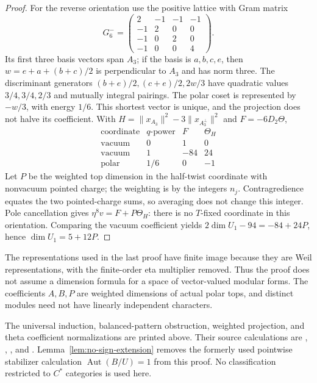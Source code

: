 \begin{proof}
For the reverse orientation use the positive lattice with Gram matrix
\[
 G_6^-=
 \begin{pmatrix}2&-1&-1&-1\\-1&2&0&0\\
 -1&0&2&0\\-1&0&0&4\end{pmatrix}.
\]
Its first three basis vectors span $A_3$; if the basis is $a,b,c,e$,
then $w=e+a+(b+c)/2$ is perpendicular to $A_3$ and has norm three.
The discriminant generators $(b+e)/2,(c+e)/2,2w/3$ have quadratic
values $3/4,3/4,2/3$ and mutually integral pairings. The polar coset
is represented by $-w/3$, with energy $1/6$. This shortest vector
is unique, and the projection does not halve its coefficient.
With $H=\|x_{A_3}\|^2-3\|x_{A_3^\perp}\|^2$ and $F=-6D_2\Theta$,
\[
\begin{array}{c|c|r|r}
 \text{coordinate}&q\text{-power}&F&\Theta_H\\\hline
 \text{vacuum}&0&1&0\\
 \text{vacuum}&1&-84&24\\
 \text{polar}&1/6&0&-1
\end{array}
\]
Let $P$ be the weighted top dimension in the half-twist coordinate
with nonvacuum pointed charge; the weighting is by the integers $n_j$.
Contragredience equates the two pointed-charge sums, so averaging
does not change this integer. Pole cancellation gives
$\eta^8v=F+P\Theta_H$: there is no $T$-fixed coordinate in this
orientation. Comparing the vacuum coefficient yields
$2\dim U_1-94=-84+24P$, hence $\dim U_1=5+12P$.
\end{proof}

The representations used in the last proof have finite image because
they are Weil representations, with the finite-order eta multiplier
removed. Thus the proof does not assume a dimension formula for a
space of vector-valued modular forms. The coefficients $A,B,P$ are
weighted dimensions of actual polar tops, and distinct modules need
not have linearly independent characters.

\begin{remark}
The universal induction, balanced-pattern obstruction, weighted
projection, and theta coefficient normalizations are printed above.
Their source calculations are
,
,
,
and .
Lemma~\ref{lem:no-sign-extension} removes the formerly used pointwise
stabilizer calculation $\operatorname{Aut}(B/U)=1$ from this proof.
No classification restricted to $C^*$ categories is used here.
\end{remark}

